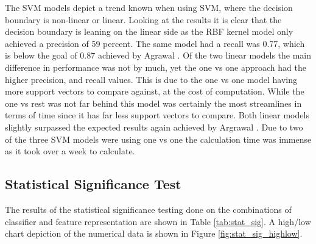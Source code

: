 \documentclass[conference]{sig-alternate-05-2015}
\begin{document}
The SVM models depict a trend known when using SVM, where the decision boundary
is non-linear or linear. Looking at the results it is clear that the decision
boundary is leaning on the linear side as the RBF kernel model only achieved a
precision of 59 percent. The same model had a recall was 0.77, which is below
the goal of 0.87 achieved by Agrawal \cite{agrawal2018deep}.  Of the two linear
models the main difference in performance was not by much, yet the one vs one
approach had the higher precision, and recall values. This is due to the one vs
one model having more support vectors to compare against, at the cost of
computation. While the one vs rest was not far behind this model was certainly
the most streamlines in terms of time since it has far less support vectors to
compare. Both linear models slightly surpassed the expected results again
achieved by Argrawal \cite{agrawal2018deep}. Due to two of the three SVM models
were using one vs one the calculation time was immense as it took over a week to
calculate.\par

\subsection{Statistical Significance Test}\label{subsec:stat_sig_discussion}

The results of the statistical significance testing done on the combinations of
classifier and feature representation are shown in Table \ref{tab:stat_sig}. A
high/low chart depiction of the numerical data is shown in Figure
\ref{fig:stat_sig_highlow}.
\end{document}
